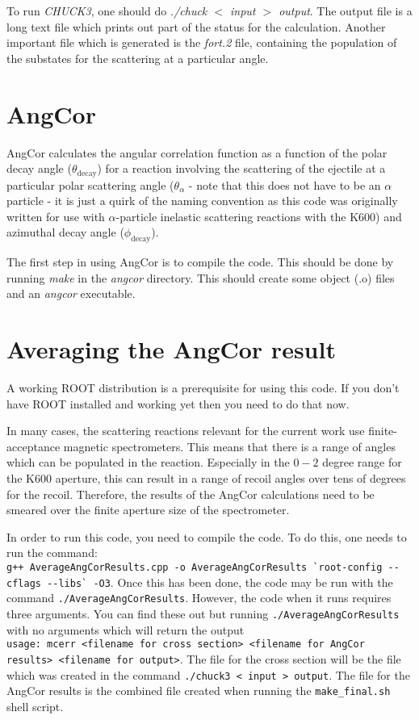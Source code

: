 \documentclass[a4paper,10pt]{article}
\begin{document}
To run {\it CHUCK3}, one should do {\it ./chuck $<$ input $>$ output}. The output file is a long text file which prints out part of the status for the calculation. Another important file which is generated is the {\it fort.2} file, containing the population of the substates for the scattering at a particular angle.

\section{AngCor}

AngCor calculates the angular correlation function as a function of the polar decay angle ($\theta_{\mathrm{decay}}$) for a reaction involving the scattering of the ejectile at a particular polar scattering angle ($\theta_{\alpha}$ - note that this does not have to be an $\alpha$ particle - it is just a quirk of the naming convention as this code was originally written for use with $\alpha$-particle inelastic scattering reactions with the K600) and azimuthal decay angle ($\phi_{\mathrm{decay}}$).

The first step in using AngCor is to compile the code. This should be done by running {\it make} in the {\it angcor} directory. This should create some object (.o) files and an {\it angcor} executable.

\section{Averaging the AngCor result}

A working ROOT distribution is a prerequisite for using this code. If you don't have ROOT installed and working yet then you need to do that now.

In many cases, the scattering reactions relevant for the current work use finite-acceptance magnetic spectrometers. This means that there is a range of angles which can be populated in the reaction. Especially in the $0-2$ degree range for the K600 aperture, this can result in a range of recoil angles over tens of degrees for the recoil. Therefore, the results of the AngCor calculations need to be smeared over the finite aperture size of the spectrometer.

In order to run this code, you need to compile the code. To do this, one needs to run the command:\\
\lstinline!g++ AverageAngCorResults.cpp -o AverageAngCorResults `root-config --cflags --libs` -O3!. Once this has been done, the code may be run with the command \lstinline!./AverageAngCorResults!. However, the code when it runs requires three arguments. You can find these out but running \lstinline!./AverageAngCorResults! with no arguments which will return the output\\ \lstinline!usage: mcerr <filename for cross section> <filename for AngCor results> <filename for output>!. The file for the cross section will be the file which was created in the command \lstinline!./chuck3 < input > output!. The file for the AngCor results is the combined file created when running the \lstinline!make_final.sh! shell script.
 
\end{document}

